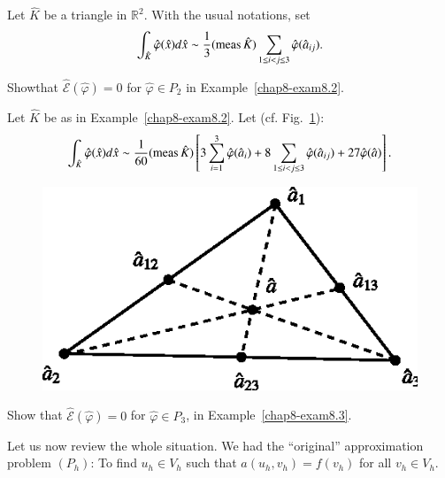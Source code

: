 \begin{example}\label{chap8-exam8.2}
Let $\hat{K}$ be a triangle in $\mathbb{R}^{2}$. With the usual
notations, set 
$$
\int_{\hat{K}}\hat{\varphi}(\hat{x})d\hat{x}\sim \frac{1}{3}(\operatorname{meas}
\hat{K})\sum_{1\leq i<j\leq 3}\hat{\varphi}(\hat{a}_{ij}).
$$
\end{example}

\begin{exercise}\label{chap8-exer8.2}
Show\pageoriginale that $\hat{\mathscr{E}}(\hat{\varphi})=0$ for
$\hat{\varphi}\in P_{2}$ in Example~\ref{chap8-exam8.2}.
\end{exercise}

\begin{example}\label{chap8-exam8.3}
Let $\hat{K}$ be as in Example~\ref{chap8-exam8.2}. Let (cf.\@
Fig.~\ref{chap8-fig8.1}): 
$$
\int_{\hat{K}}\hat{\varphi}(\hat{x})d\hat{x}\sim\frac{1}{60}(\operatorname{meas}
\hat{K})\left[3\sum^{3}_{i=1}\hat{\varphi}(\hat{a}_{i})+8\sum_{1\leq
    i<j\leq
    3}\hat{\varphi}(\hat{a}_{ij})+27\hat{\varphi}(\hat{a})\right]. 
$$
\begin{figure}[H]
\centering
\includegraphics{figure/fig8.1.eps}
\caption{}\label{chap8-fig8.1}
\end{figure}
\end{example}

\begin{exercise}\label{chap8-exer8.3}
Show that $\hat{\mathscr{E}}(\hat{\varphi})=0$ for $\hat{\varphi}\in
P_{3}$, in Example~\ref{chap8-exam8.3}.
\end{exercise}

Let us now review the whole situation. We had the ``original''
approximation problem $(P_{h})$: To find $u_{h}\in V_{h}$ such that
$a(u_{h},v_{h})=f(v_{h})$ for all $v_{h}\in V_{h}$.

